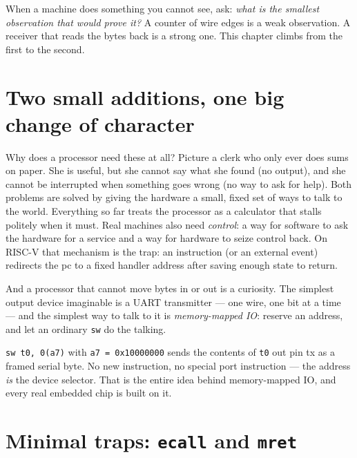 \begin{rulebox}
When a machine does something you cannot see, ask: \emph{what is the
smallest observation that would prove it?} A counter of wire edges is a
weak observation. A receiver that reads the bytes back is a strong one.
This chapter climbs from the first to the second.
\end{rulebox}

\section{Two small additions, one big change of character}
\label{sec:doors08}

Why does a processor need these at all? Picture a clerk who only ever
does sums on paper. She is useful, but she cannot say what she found
(no output), and she cannot be interrupted when something goes wrong
(no way to ask for help). Both problems are solved by giving the
hardware a small, fixed set of ways to talk to the world. Everything so
far treats the processor as a calculator that stalls
politely when it must. Real machines also need \emph{control}: a way
for software to ask the hardware for a service and a way for hardware
to seize control back. On RISC-V that mechanism is the trap: an
instruction (or an external event) redirects the pc to a fixed
handler address after saving enough state to return.

And a processor that cannot move bytes in or out is a curiosity.
The simplest output device imaginable is a UART transmitter --- one
wire, one bit at a time --- and the simplest way to talk to it is
\emph{memory-mapped IO}: reserve an address, and let an ordinary
\texttt{sw} do the talking.

\begin{example}
\texttt{sw t0, 0(a7)} with \texttt{a7 = 0x10000000} sends the
contents of \texttt{t0} out pin tx as a framed serial byte. No new
instruction, no special port instruction --- the address
\emph{is} the device selector. That is the entire idea behind
memory-mapped IO, and every real embedded chip is built on it.
\end{example}



\section{Minimal traps: \texttt{ecall} and \texttt{mret}}
\label{sec:traps08}

